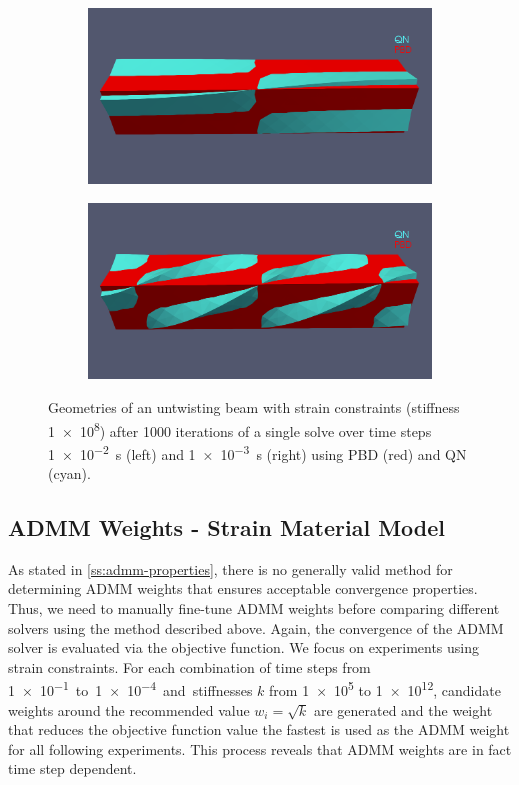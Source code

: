 \begin{figure}
    \begin{subfigure}{0.49\textwidth}
    \includegraphics[width=\textwidth, trim={0 5.0cm 0 2.5cm}, clip]{figures/strain_pbd_1e-2.png}
    \end{subfigure}
    \begin{subfigure}{0.49\textwidth}
    \includegraphics[width=\textwidth, trim={0 5.0cm 0 2.5cm}, clip]{figures/strain_pbd_1e-3.png}
    \end{subfigure}
    \caption{Geometries of an untwisting beam with strain constraints (stiffness \num{1e8}) after 1000 iterations of a single solve over time steps \SI{1e-2}{\second} (left) 
    and \SI{1e-3}{\second} (right) using PBD (red) and QN (cyan).}
    \label{fig:strain-pbd}
\end{figure}


\subsection{ADMM Weights - Strain Material Model}
As stated in \autoref{ss:admm-properties}, there is no generally valid method for determining ADMM weights that ensures acceptable convergence properties.
Thus, we need to manually fine-tune ADMM weights before comparing different solvers using the method described above. Again, the convergence of the ADMM solver is evaluated via 
the objective function. We focus on experiments using strain constraints. For each combination of time steps from \SI{1e-1} to \SI{1e-4} and stiffnesses $k$ from 
\num{1e5} to \num{1e12}, candidate weights around the recommended value $w_i = \sqrt{k}$ are generated and the weight that reduces the objective function value the 
fastest is used as the ADMM weight for all following experiments. This process reveals that ADMM weights are in fact time step dependent.

